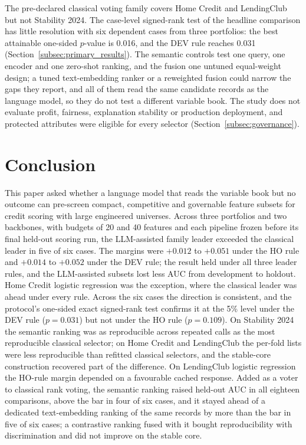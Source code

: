 \documentclass[final,5p,twocolumn]{elsarticle}
\begin{document}
The pre-declared classical voting family covers Home Credit and LendingClub but not Stability 2024. The case-level signed-rank test of the headline comparison has little resolution with six dependent cases from three portfolios: the best attainable one-sided $p$-value is 0.016, and the DEV rule reaches 0.031 (Section~\ref{subsec:primary_results}). The semantic controls test one query, one encoder and one zero-shot ranking, and the fusion one untuned equal-weight design; a tuned text-embedding ranker or a reweighted fusion could narrow the gaps they report, and all of them read the same candidate records as the language model, so they do not test a different variable book. The study does not evaluate profit, fairness, explanation stability or production deployment, and protected attributes were eligible for every selector (Section~\ref{subsec:governance}).


\section{Conclusion}
\label{sec:conclusion}

This paper asked whether a language model that reads the variable book but no outcome can pre-screen compact, competitive and governable feature subsets for credit scoring with large engineered universes. Across three portfolios and two backbones, with budgets of 20 and 40 features and each pipeline frozen before its final held-out scoring run, the LLM-assisted family leader exceeded the classical leader in five of six cases. The margins were $+0.012$ to $+0.051$ under the HO rule and $+0.014$ to $+0.052$ under the DEV rule; the result held under all three leader rules, and the LLM-assisted subsets lost less AUC from development to holdout. Home Credit logistic regression was the exception, where the classical leader was ahead under every rule. Across the six cases the direction is consistent, and the protocol's one-sided exact signed-rank test confirms it at the 5\% level under the DEV rule ($p=0.031$) but not under the HO rule ($p=0.109$). On Stability 2024 the semantic ranking was as reproducible across repeated calls as the most reproducible classical selector; on Home Credit and LendingClub the per-fold lists were less reproducible than refitted classical selectors, and the stable-core construction recovered part of the difference. On LendingClub logistic regression the HO-rule margin depended on a favourable cached response. Added as a voter to classical rank voting, the semantic ranking raised held-out AUC in all eighteen comparisons, above the bar in four of six cases, and it stayed ahead of a dedicated text-embedding ranking of the same records by more than the bar in five of six cases; a contrastive ranking fused with it bought reproducibility with discrimination and did not improve on the stable core.
\end{document}
